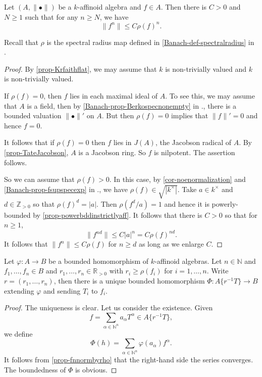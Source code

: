 \begin{proposition}\label{prop-fnnormbyrho}
    Let $(A,\|\bullet\|)$ be a $k$-affinoid algebra and $f\in A$. Then there is $C>0$ and $N\geq 1$ such that for any $n\geq N$, we have
    \[
        \|f^n\|\leq C\rho(f)^n.  
    \]
\end{proposition}
Recall that $\rho$ is the spectral radius map defined in \cref{Banach-def-spectralradius} in .
\begin{proof}
    By \cref{prop-Krfaithflat}, we may assume that $k$ is non-trivially valued and $k$ is non-trivially valued.
    
    If $\rho(f)=0$, then $f$ lies in each maximal ideal of $A$. To see this, we may assume that $A$ is a field, then by \cref{Banach-prop-Berkospecnonempty} in ., there is a bounded valuation $\|\bullet\|'$ on $A$. But then $\rho(f)=0$ implies that $\|f\|'=0$ and hence $f=0$.

    It follows that if $\rho(f)=0$ then $f$ lies in $J(A)$, the Jacobson radical of $A$. By \cref{prop-TateJacobson}, $A$ is a Jacobson ring. So $f$ is nilpotent. The assertion follows.

    So we can assume that $\rho(f)>0$. In this case, by \cref{cor-noenormalization} and \cref{Banach-prop-fsupspecexp} in ., we have $\rho(f)\in \sqrt{|k^{\times}|}$. Take $a\in k^{\times}$ and $d\in \mathbb{Z}_{>0}$ so that $\rho(f)^d=|a|$. Then $\rho(f^d/a)=1$ and hence it is powerly-bounded by \cref{prop-powerbddinstrictlyaff}. It follows that there is $C>0$ so that for $n\geq 1$, 
    \[
        \|f^{nd}\|\leq C |a|^n=C\rho(f)^{nd}. 
    \]
    It follows that $\|f^n\|\leq C\rho(f)$ for $n\geq d$ as long as we enlarge $C$.
\end{proof}


\begin{corollary}\label{cor-univpropTatenonstrict}
    Let $\varphi:A\rightarrow B$ be a bounded homomorphism of $k$-affinoid algebras. Let $n\in \mathbb{N}$ and  $f_1,\ldots,f_n\in B$ and $r_1,\ldots,r_n\in \mathbb{R}_{>0}$ with $r_i\geq \rho(f_i)$ for $i=1,\ldots,n$. Write $r=(r_1,\ldots,r_n)$, then there is a unique bounded homomorphism $\Phi:A\{r^{-1}T\}\rightarrow B$ extending $\varphi$ and sending $T_i$ to $f_i$.
\end{corollary}
\begin{proof}
    The uniqueness is clear. Let us consider the existence. Given 
    \[
        f=\sum_{\alpha\in \mathbb{N}^n} a_{\alpha}T^{\alpha}\in A\{r^{-1}T\}, 
    \]
    we define 
    \[
        \Phi(h)=\sum_{\alpha\in \mathbb{N}^n} \varphi(a_{\alpha})f^{\alpha}. 
    \]
    It follows from \cref{prop-fnnormbyrho} that the right-hand side the series converges. The boundedness of $\Phi$ is obvious.
\end{proof}



